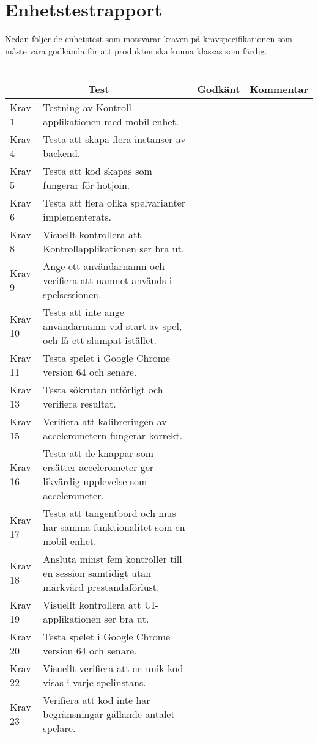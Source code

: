 \documentclass[10pt]{article}
\begin{document}
\section{Enhetstestrapport}
	Nedan följer de enhetstest som motsvarar kraven på kravspecifikationen \cite{bib-kravspecifikation} som måste vara godkända för att produkten ska kunna klassas som färdig.
\\ \\
\noindent
\begin{tabular}{| p{1.5cm} | p{5cm} | p{1.2cm}| p{7cm}|}
	
	\hline
	\multicolumn{2}{|c|}{Test}&{Godkänt}&{Kommentar}\\
    	\hline
    
		Krav 1&Testning av Kontroll-applikationen med mobil enhet.&&\\
		\hline
		Krav 4& Testa att skapa flera instanser av backend.&&\\
		\hline
		Krav 5&Testa att kod skapas som fungerar för hotjoin.&&\\
		\hline
		Krav 6&Testa att flera olika spelvarianter implementerats.&&\\
		\hline
		Krav 8&Visuellt kontrollera att Kontrollapplikationen ser bra ut.&&\\
		\hline
		Krav 9&Ange ett användarnamn och verifiera att namnet används i spelsessionen.&&\\
		\hline
		Krav 10&Testa att inte ange användarnamn vid start av spel, och få ett slumpat istället.&& \\
		\hline
		Krav 11&Testa spelet i Google Chrome version 64 och senare.&&\\
		\hline
		Krav 13&Testa sökrutan utförligt och verifiera resultat.&& \\
		\hline
		Krav 15&Verifiera att kalibreringen av accelerometern fungerar korrekt.&&\\
		\hline
		Krav 16&Testa att de knappar som ersätter accelerometer ger likvärdig upplevelse som accelerometer.&&\\
		\hline
		Krav 17&Testa att tangentbord och mus har samma funktionalitet som en mobil enhet.&&\\
		\hline
		Krav 18&Ansluta minst fem kontroller till en session samtidigt utan märkvärd prestandaförlust.&&\\
		\hline
		Krav 19&Visuellt kontrollera att UI-applikationen ser bra ut.&&\\
		\hline
		Krav 20&Testa spelet i Google Chrome version 64 och senare. &&\\
		\hline
		Krav 22&Visuellt verifiera att en unik kod visas i varje spelinstans.&&\\
		\hline
		Krav 23&Verifiera att kod inte har begränsningar gällande antalet spelare.&& \\
		\hline


   
  \end{tabular}
  \\
  \\
  
\end{document}
